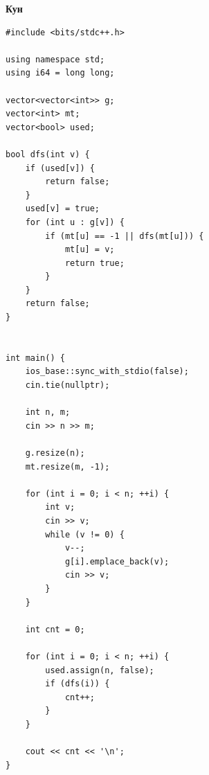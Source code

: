 \documentclass[a4paper, 10pt]{article}
\begin{document}
{\Large \textbf{Кун}}
\begin{lstlisting}
#include <bits/stdc++.h>

using namespace std;
using i64 = long long;

vector<vector<int>> g;
vector<int> mt;
vector<bool> used;

bool dfs(int v) {
    if (used[v]) {
        return false;
    }
    used[v] = true;
    for (int u : g[v]) {
        if (mt[u] == -1 || dfs(mt[u])) {
            mt[u] = v;
            return true;
        }
    }
    return false;
}


int main() {
    ios_base::sync_with_stdio(false);
    cin.tie(nullptr);

    int n, m;
    cin >> n >> m;

    g.resize(n);
    mt.resize(m, -1);

    for (int i = 0; i < n; ++i) {
        int v;
        cin >> v;
        while (v != 0) {
            v--;
            g[i].emplace_back(v);
            cin >> v;
        }
    }

    int cnt = 0;

    for (int i = 0; i < n; ++i) {
        used.assign(n, false);
        if (dfs(i)) {
            cnt++;
        }
    }

    cout << cnt << '\n';
}
\end{lstlisting}
\end{document}
